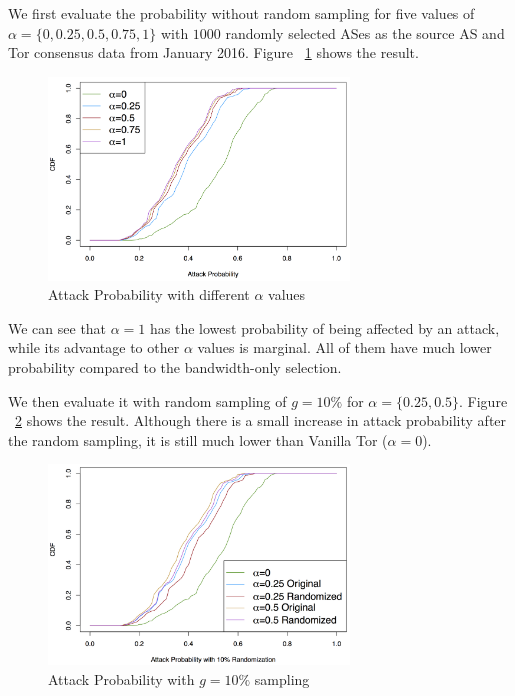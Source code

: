 We first evaluate the probability without random sampling for five values of $\alpha=\{0, 0.25, 0.5, 0.75, 1\}$ with $1000$ randomly selected ASes as the source AS and Tor consensus data from January 2016. Figure ~\ref{fig_attack} shows the result. 

\begin{figure}[ht!]
\centering
\includegraphics[width=80mm]{figure/attack}
\caption{Attack Probability with different $\alpha$ values \label{fig_attack}}
\end{figure}

We can see that $\alpha=1$ has the lowest probability of being affected by an attack, while its advantage to other $\alpha$ values is marginal. All of them have much lower probability compared to the bandwidth-only selection. 

We then evaluate it with random sampling of $g=10\%$ for $\alpha=\{0.25, 0.5\}$. Figure ~\ref{fig_attack_random} shows the result. Although there is a small increase in attack probability after the random sampling, it is still much lower than Vanilla Tor ($\alpha=0$). 

\begin{figure}[ht!]
\centering
\includegraphics[width=80mm]{figure/attack_randomize}
\caption{Attack Probability with $g=10\%$ sampling \label{fig_attack_random}}
\end{figure}

